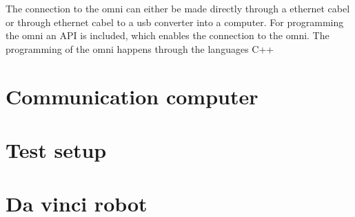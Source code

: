 The connection to the omni can either be made directly through a ethernet cabel or through ethernet cabel to a usb converter into a computer. For programming the omni an API is included, which enables the connection to the omni. The programming of the omni happens through the languages C++ 



\section{Communication computer}

\section{Test setup}

\section{Da vinci robot}
